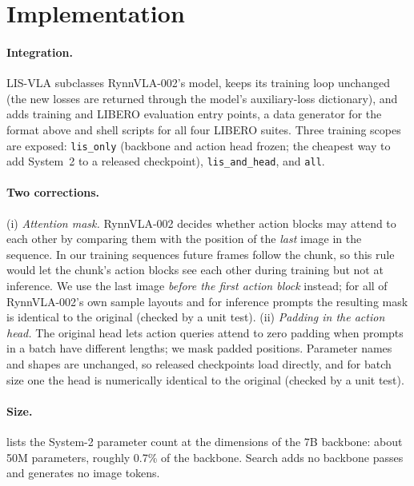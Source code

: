 \documentclass[11pt]{article}
\begin{document}
\section{Implementation}
\label{sec:impl}

\paragraph{Integration.} LIS-VLA subclasses RynnVLA-002's model, keeps its training loop unchanged (the new losses are returned through the model's auxiliary-loss dictionary), and adds training and LIBERO evaluation entry points, a data generator for the format above and shell scripts for all four LIBERO suites. Three training scopes are exposed: \texttt{lis\_only} (backbone and action head frozen; the cheapest way to add System~2 to a released checkpoint), \texttt{lis\_and\_head}, and \texttt{all}.

\paragraph{Two corrections.} (i) \emph{Attention mask.} RynnVLA-002 decides whether action blocks may attend to each other by comparing them with the position of the \emph{last} image in the sequence. In our training sequences future frames follow the chunk, so this rule would let the chunk's action blocks see each other during training but not at inference. We use the last image \emph{before the first action block} instead; for all of RynnVLA-002's own sample layouts and for inference prompts the resulting mask is identical to the original (checked by a unit test). (ii) \emph{Padding in the action head.} The original head lets action queries attend to zero padding when prompts in a batch have different lengths; we mask padded positions. Parameter names and shapes are unchanged, so released checkpoints load directly, and for batch size one the head is numerically identical to the original (checked by a unit test).

\paragraph{Size.}  lists the System-2 parameter count at the dimensions of the 7B backbone: about 50M parameters, roughly 0.7\% of the backbone. Search adds no backbone passes and generates no image tokens.
\end{document}
